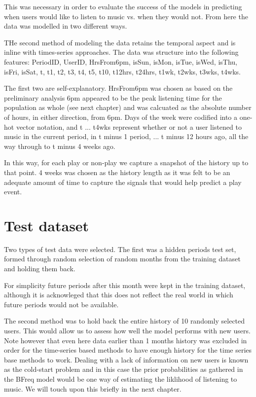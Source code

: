 This was necessary in order to evaluate the success of the models in predicting when users would like to listen to music vs. when they would not. From here the data was modelled in two different ways. 

THe second method of modeling the data retains the temporal aspect and is inline with times-series approaches. The data was structure into the following features: PeriodID, UserID, HrsFrom6pm, isSun, isMon, isTue, isWed, isThu, isFri, isSat, t, t1, t2, t3, t4, t5, t10, t12hrs, t24hrs, t1wk, t2wks, t3wks, t4wks.

The first two are self-explanatory. HrsFrom6pm was chosen as based on the preliminary analysis 6pm appeared to be the peak listening time for the population as whole (see next chapter) and was calcuated as the absolute number of hours, in either direction, from 6pm. Days of the week were codified into a one-hot vector notation, and t ... t4wks represent whether or not a user listened to music in the current period, in t minus 1 period, ... t minus 12 hours ago, all the way through to t minus 4 weeks ago.

In this way, for each play or non-play we capture a snapshot of the history up to that point. 4 weeks was chosen as the history length as it was felt to be an adequate amount of time to capture the signals that would help predict a play event.

\section{Test dataset}
 
Two types of test data were selected. The first was a hidden periods test set, formed through random selection of random months from the training dataset and holding them back. 

For simplicity future periods after this month were kept in the training dataset, although it is acknowleged that this does not reflect the real world in which future periods would not be available.

The second method was to hold back the entire history of 10 randomly selected users. This would allow us to assess how well the model performs with new users. Note however that even here data earlier than 1 months history was excluded in order for the time-series based methods to have enough history for the time series base methods to work. Dealing with a lack of information on new users is known as the cold-start problem and in this case the prior probabilities as gathered in the BFreq model would be one way of estimating the liklihood of listening to music. We will touch upon this briefly in the next chapter.

